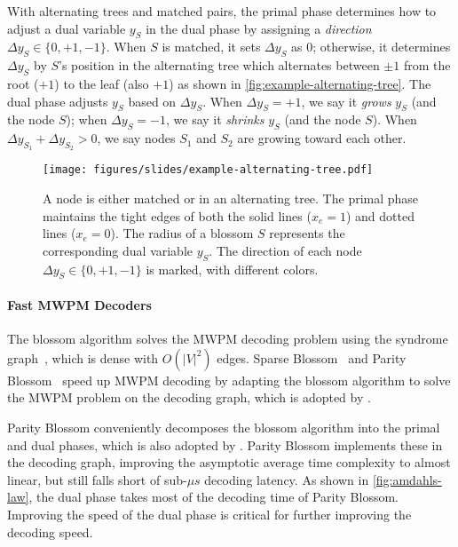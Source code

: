 With alternating trees and matched pairs, the primal phase determines how to adjust a dual variable $y_S$ in the dual phase by assigning a \emph{direction} $\Delta y_S \in \{ 0, +1, -1 \}$.
When $S$ is matched, it sets $\Delta y_S$ as $0$; 
otherwise, it determines $\Delta y_S$ by $S$'s position in the alternating tree which alternates between $\pm 1$ from the root ($+1$) to the leaf (also $+1$) as shown in \autoref{fig:example-alternating-tree}.
The dual phase adjusts $y_S$ based on $\Delta y_S$. When $\Delta y_S=+1$, we say it \emph{grows} $y_S$ (and the node $S$); when $\Delta y_S=-1$, we say it \emph{shrinks} $y_S$ (and the node $S$).
When $\Delta y_{S_1}+\Delta y_{S_2}>0$, we say nodes $S_1$ and $S_2$ are growing toward each other. 

\begin{figure}[!t]
    \centering
    \texttt{[image: figures/slides/example-alternating-tree.pdf]}
    \caption{A node is either matched or in an alternating tree. The primal phase maintains the tight edges of both the solid lines ($x_e = 1$) and dotted lines ($x_e = 0$). The radius of a blossom $S$ represents the corresponding dual variable $y_S$. The direction of each node $\Delta y_S \in \{ 0, +1, -1 \}$ is marked, with different colors.}
    \label{fig:example-alternating-tree}
\end{figure}

\paragraph{Fast MWPM Decoders}
The blossom algorithm solves the MWPM decoding problem using the syndrome graph~\cite{wu2022interpretation}, which is dense with $O(|V|^2)$ edges.
Sparse Blossom~\cite{higgott2025sparse} and Parity Blossom~\cite{wu2023qce} speed up MWPM decoding by adapting the blossom algorithm to solve the MWPM problem on the decoding graph, which is adopted by \arch.

Parity Blossom conveniently decomposes the blossom algorithm into the primal and dual phases, which is also adopted by \arch.
Parity Blossom implements these in the decoding graph, improving the asymptotic average time complexity to almost linear, but still falls short of sub-$\mu s$ decoding latency.
As shown in \autoref{fig:amdahls-law}, the dual phase takes most of the decoding time of Parity Blossom.
Improving the speed of the dual phase is critical for further improving the decoding speed.

